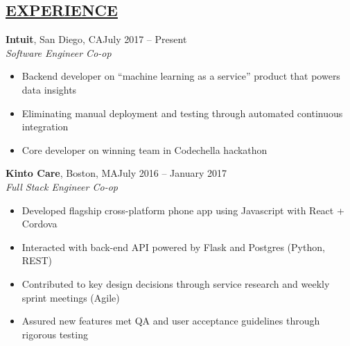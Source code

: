 \documentclass[overlapped,line]{res}
\begin{document}
\begin{resume}
\noindent\makebox[7.15in]{\rule{7.15in}{0.4pt}}

\section{\underline{EXPERIENCE}}

\textbf{Intuit}, San Diego, CA\hfill July 2017 \--- Present\\
{\sl Software Engineer Co-op}
\begin{itemize} \itemsep -2pt
\item Backend developer on ``machine learning as a service'' product that powers data insights
\item Eliminating manual deployment and testing through automated continuous integration
\item Core developer on winning team in Codechella hackathon
\end{itemize}

\textbf{Kinto Care}, Boston, MA\hfill July 2016 \--- January 2017\\
{\sl Full Stack Engineer Co-op}
\begin{itemize} \itemsep -2pt
\item Developed flagship cross-platform phone app using Javascript with React + Cordova
\item Interacted with back-end API powered by Flask and Postgres (Python, REST)
\item Contributed to key design decisions through service research and weekly sprint meetings (Agile)
\item Assured new features met QA and user acceptance guidelines through rigorous testing 
\end{itemize}



\end{resume}
\end{document}
